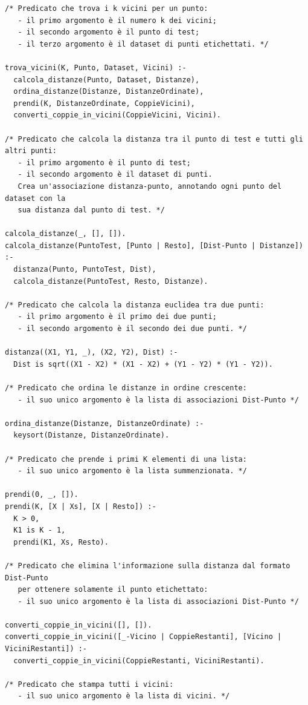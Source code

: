 \documentclass[11pt]{article}
\theoremstyle{definition}
\begin{document}
\begin{verbatim}
/* Predicato che trova i k vicini per un punto:
   - il primo argomento è il numero k dei vicini;
   - il secondo argomento è il punto di test;
   - il terzo argomento è il dataset di punti etichettati. */

trova_vicini(K, Punto, Dataset, Vicini) :-
  calcola_distanze(Punto, Dataset, Distanze),
  ordina_distanze(Distanze, DistanzeOrdinate),
  prendi(K, DistanzeOrdinate, CoppieVicini),
  converti_coppie_in_vicini(CoppieVicini, Vicini).

/* Predicato che calcola la distanza tra il punto di test e tutti gli altri punti: 
   - il primo argomento è il punto di test;
   - il secondo argomento è il dataset di punti.
   Crea un'associazione distanza-punto, annotando ogni punto del dataset con la 
   sua distanza dal punto di test. */

calcola_distanze(_, [], []).
calcola_distanze(PuntoTest, [Punto | Resto], [Dist-Punto | Distanze]) :-
  distanza(Punto, PuntoTest, Dist),
  calcola_distanze(PuntoTest, Resto, Distanze).
  
/* Predicato che calcola la distanza euclidea tra due punti: 
   - il primo argomento è il primo dei due punti;
   - il secondo argomento è il secondo dei due punti. */

distanza((X1, Y1, _), (X2, Y2), Dist) :-
  Dist is sqrt((X1 - X2) * (X1 - X2) + (Y1 - Y2) * (Y1 - Y2)).

/* Predicato che ordina le distanze in ordine crescente:
   - il suo unico argomento è la lista di associazioni Dist-Punto */

ordina_distanze(Distanze, DistanzeOrdinate) :-
  keysort(Distanze, DistanzeOrdinate).

/* Predicato che prende i primi K elementi di una lista:
   - il suo unico argomento è la lista summenzionata. */

prendi(0, _, []).
prendi(K, [X | Xs], [X | Resto]) :-
  K > 0,
  K1 is K - 1,
  prendi(K1, Xs, Resto).
  
/* Predicato che elimina l'informazione sulla distanza dal formato Dist-Punto 
   per ottenere solamente il punto etichettato:
   - il suo unico argomento è la lista di associazioni Dist-Punto */

converti_coppie_in_vicini([], []).
converti_coppie_in_vicini([_-Vicino | CoppieRestanti], [Vicino | ViciniRestanti]) :-
  converti_coppie_in_vicini(CoppieRestanti, ViciniRestanti).
  
/* Predicato che stampa tutti i vicini: 
   - il suo unico argomento è la lista di vicini. */


\end{verbatim}
\end{document}
